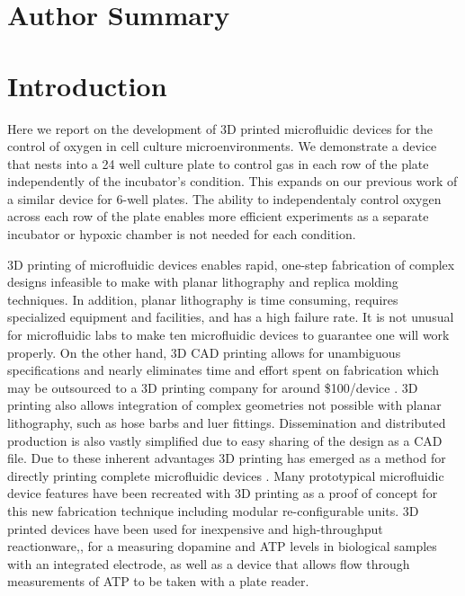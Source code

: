 \section*{Author Summary}



\section*{Introduction}

Here we report on the development of 3D printed microfluidic devices for the control of oxygen in cell culture microenvironments.
We demonstrate a device that nests into a 24 well culture plate to control gas in each row of the plate independently of the incubator's condition.
This expands on our previous work of a similar device for 6-well plates\cite{Oppegard2009,Oppegard2010}.
The ability to independentaly control oxygen across each row of the plate enables more efficient experiments as a separate incubator or hypoxic chamber is not needed for each condition.

3D printing of microfluidic devices enables rapid, one-step fabrication of complex designs infeasible to make with planar lithography and replica molding techniques.
In addition, planar lithography is time consuming, requires specialized equipment and facilities, and has a high failure rate.
It is not unusual for microfluidic labs to make ten microfluidic devices to guarantee one will work properly.
On the other hand, 3D CAD printing allows for unambiguous specifications and nearly eliminates time and effort spent on fabrication which may be outsourced to a 3D printing company for around \$100/device \cite{Au2014}.
3D printing also allows integration of complex geometries not possible with planar lithography, such as hose barbs and luer fittings.
Dissemination and distributed production is also vastly simplified due to easy sharing of the design as a CAD file.
Due to these inherent advantages 3D printing has emerged as a method for directly printing complete microfluidic devices \cite{Au2014, Shallan 2014, Chen2014, Erkal2014,Bhargava2014}. 
Many prototypical microfluidic device features have been recreated with 3D printing as a proof of concept for this new fabrication technique \cite{Au2014, Shallan2014} including modular re-configurable units\cite{Bharagava2014}.
3D printed devices have been used for inexpensive and high-throughput reactionware,\cite{Kitson2014}, for a measuring dopamine and ATP levels in biological samples with an integrated electrode\cite{Erkal2014}, as well as a device that allows flow through measurements of ATP to be taken with a plate reader\cite{Chen2014}.

